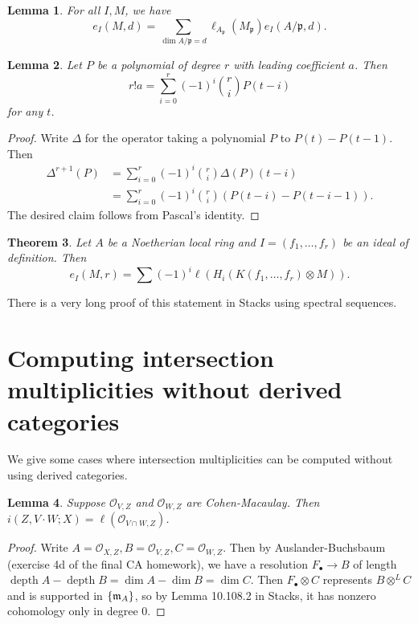 \documentclass[leqno, openany]{memoir}
\newtheorem{thm}{Theorem}[section]
\newtheorem{lem}[thm]{Lemma}
\theoremstyle{definition}
\theoremstyle{remark}
\theoremstyle{plain}
\theoremstyle{definition}
\theoremstyle{remark}
\newcommand{\mc}[1]{\mathcal{#1}}
\newcommand{\mf}[1]{\mathfrak{#1}}
\DeclareMathOperator{\depth}{depth}
\begin{document}
\begin{lem} For all $I, M$, we have \[ e_I(M, d) = \sum_{\dim A/\mf{p} = d}
\ell_{A_{\mf{p}}} (M_{\mf{p}}) e_{I}(A/\mf{p}, d). \] \end{lem}

\begin{lem} Let $P$ be a polynomial of degree $r$ with leading coefficient $a$.
    Then \[ r! a = \sum_{i=0}^r {(-1)}^i \binom{r}{i} P(t-i) \] for any $t$.
\end{lem}

\begin{proof} Write $\Delta$ for the operator taking a polynomial $P$ to $P(t)
    - P(t-1)$. Then \begin{align*} \Delta^{r+1}(P) &= \sum_{i=0}^r {(-1)}^i
        \binom{r}{i} \Delta(P)(t-i) \\ &= \sum_{i=0}^r {(-1)}^i \binom{r}{i}
        (P(t-i) - P(t-i-1)).  \end{align*} The desired claim follows from
    Pascal's identity.  \end{proof}

\begin{thm} Let $A$ be a Noetherian local ring and $I = (f_1, \ldots, f_r)$ be
    an ideal of definition. Then \[ e_I(M, r) = \sum {(-1)}^i \ell(H_i(K(f_1,
    \ldots, f_r) \otimes M)). \] \end{thm}

There is a very long proof of this statement in Stacks using spectral
sequences.

\section{Computing intersection multiplicities without derived categories}%
\label{sec:computing_intersection_multiplicities_without_derived_categories}

We give some cases where intersection multiplicities can be computed without
using derived categories.

\begin{lem} Suppose $\mc{O}_{V,Z}$ and $\mc{O}_{W,Z}$ are Cohen-Macaulay. Then
$i(Z, V \cdot W; X) = \ell(\mc{O}_{V \cap W, Z})$.  \end{lem}

\begin{proof} Write $A = \mc{O}_{X,Z}, B = \mc{O}_{V,Z}, C = \mc{O}_{W,Z}$.
    Then by Auslander-Buchsbaum (exercise 4d of the final CA homework), we have
    a resolution $F_{\bullet} \to B$ of length $\depth A - \depth B = \dim A -
    \dim B = \dim C$. Then $F_{\bullet} \otimes C$ represents $B \otimes^L C$
    and is supported in $\qty{ \mf{m}_A }$, so by Lemma 10.108.2 in Stacks, it
    has nonzero cohomology only in degree $0$.  \end{proof}
\end{document}
